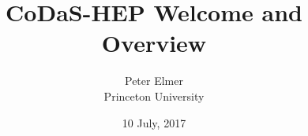 \documentclass{beamer}
\title{CoDaS-HEP Welcome and Overview}
\author{Peter Elmer \\ Princeton University}
\date{10 July, 2017}
\begin{document}
%

\begin{frame}
  \titlepage
\end{frame}

%










\end{document}
